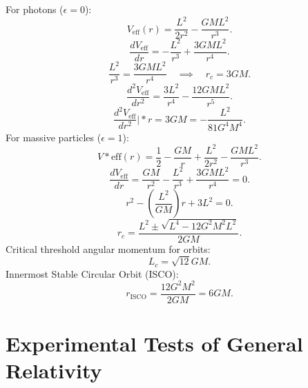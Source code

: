 \documentclass[11pt, a4paper]{report}
\begin{document}
For photons ($\epsilon=0$):
\begin{equation}
V_{\text{eff}}(r) = \frac{L^{2}}{2r^{2}} - \frac{GML^{2}}{r^{3}}.
\end{equation}
\begin{equation}
\frac{dV_{\text{eff}}}{dr} = -\frac{L^{2}}{r^{3}} + \frac{3GML^{2}}{r^{4}}.
\end{equation}
\begin{equation}
\frac{L^{2}}{r^{3}} = \frac{3GML^{2}}{r^{4}} \quad \implies \quad r_{c} = 3GM.
\end{equation}
\begin{equation}
\frac{d^{2}V_{\text{eff}}}{dr^{2}} = \frac{3L^{2}}{r^{4}} - \frac{12GML^{2}}{r^{5}}.
\end{equation}
\begin{equation}
\frac{d^{2}V_{\text{eff}}}{dr^{2}}\bigg|*{r=3GM} = -\frac{L^{2}}{81G^{4}M^{4}}.
\end{equation}
For massive particles ($\epsilon=1$):
\begin{equation}
V*{\text{eff}}(r) = \frac{1}{2} - \frac{GM}{r} + \frac{L^{2}}{2r^{2}} - \frac{GML^{2}}{r^{3}}.
\end{equation}
\begin{equation}
\frac{dV_{\text{eff}}}{dr} = \frac{GM}{r^{2}} - \frac{L^{2}}{r^{3}} + \frac{3GML^{2}}{r^{4}} = 0.
\end{equation}
\begin{equation}
r^{2} - \left(\frac{L^{2}}{GM}\right)r + 3L^{2} = 0.
\end{equation}
\begin{equation}
\label{eq:circular_radii}
r_{c} = \frac{L^{2} \pm \sqrt{L^{4} - 12G^{2}M^{2}L^{2}}}{2GM}.
\end{equation}
Critical threshold angular momentum for orbits:
\begin{equation}
L_{c} = \sqrt{12}GM.
\end{equation}
Innermost Stable Circular Orbit (ISCO):
\begin{equation}
r_{\text{ISCO}} = \frac{12G^{2}M^{2}}{2GM} = 6GM.
\end{equation}

\section{Experimental Tests of General Relativity}
\end{document}
